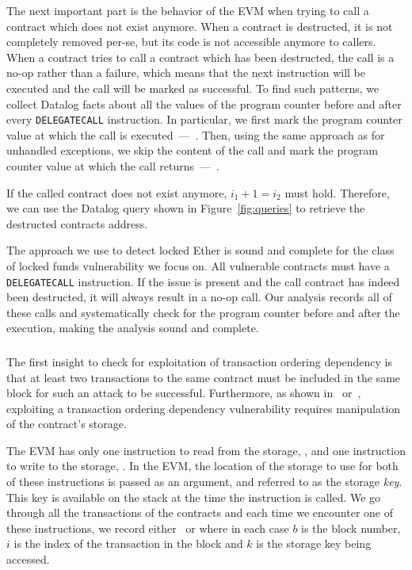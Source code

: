 The next important part is the behavior of the EVM when trying to call a contract which does not exist anymore.
When a contract is destructed, it is not completely removed per-se, but its code is not accessible anymore to callers.
When a contract tries to call a contract which has been destructed, the call is a no-op rather than a failure, which means that the next instruction will be executed and the call will be marked as successful.
To find such patterns, we collect Datalog facts about all the values of the program counter before and after every \lstinline{DELEGATECALL} instruction. In particular, we first mark the program counter value at which the call is executed~---~. Then, using the same approach as for unhandled exceptions, we skip the content of the call and mark the program counter value at which the call returns~---~.

If the called contract does not exist anymore, $i_1 + 1 = i_2$ must hold. Therefore, we can use the Datalog query shown in Figure~\ref{fig:queries} to retrieve the destructed contracts address.

\correctness The approach we use to detect locked Ether is sound and complete for the class of locked funds vulnerability we focus on. All vulnerable contracts must have a \lstinline{DELEGATECALL} instruction. If the issue is present and the call contract has indeed been destructed, it will always result in a no-op call. Our analysis records all of these calls and systematically check for the program counter before and after the execution, making the analysis sound and complete.


\subsubsection{\transactionorder}
The first insight to check for exploitation of transaction ordering dependency is that at least two transactions to the same contract must be included in the same block for such an attack to be successful. Furthermore, as shown in~\cite{Luu2016a} or~\cite{Tsankov2018}, exploiting a transaction ordering dependency vulnerability requires manipulation of the contract's storage.

The EVM has only one instruction to read from the storage, , and one instruction to write to the storage, . In the EVM, the location of the storage to use for both of these instructions is passed as an argument, and referred to as the storage \emph{key}. This key is available on the stack at the time the instruction is called. We go through all the transactions of the contracts and each time we encounter one of these instructions, we record either~ or  where in each case $b$ is the block number, $i$ is the index of the transaction in the block and $k$ is the storage key being accessed.

